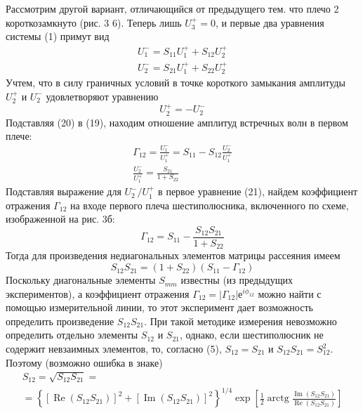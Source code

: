 \documentclass[a4paper,12pt]{article}
\begin{document}
Рассмотрим другой вариант, отличающийся от предыдущего тем. что плечо 2 короткозамкнуто (рис. 3 6). Теперь лишь $U_3^+=0$, и первые два уравнения системы (1) примут вид
\begin{equation}
	\begin{array} { l } { U _ { 1 } ^ { - } = S _ { 11 } U _ { 1 } ^ { + } + S _ { 12 } U _ { 2 } ^ { + } } \\ { U _ { 2 } ^ { - } = S _ { 21 } U _ { 1 } ^ { + } + S _ { 22 } U _ { 2 } ^ { + } } \end{array}
\end{equation}
Учтем, что в силу граничных условий в точке короткого замыкания амплитуды $U_2^+$ и $U_2^-$ удовлетворяют уравнению
\begin{equation}
	U _ { 2 } ^ { + } = - U _ { 2 } ^ { - }
\end{equation}
Подставляя (20) в (19), находим отношение амплитуд встречных волн в первом плече:
\begin{equation}
	\begin{array} { l } { \Gamma _ { 12 } = \frac { U _ { 1 } ^ { - } } { U _ { 1 } ^ { + } } = S _ { 11 } - S _ { 12 } \frac { U _ { 2 } ^ { - } } { U _ { 1 } ^ { + } } } \\ { \frac { U _ { 2 } ^ { - } } { U _ { 1 } ^ { + } } = \frac { S _ { 21 } } { 1 + S _ { 22 } } } \end{array}
\end{equation}
Подставляя выражение для $U_2^-/U_1^+$ в первое уравнение (21), найдем коэффициент отражения $\Gamma_{12}$ на входе первого плеча шестиполюсника, включенного по схеме, изображенной на рис. 3б:
\begin{equation}
	\Gamma _ { 12 } = S _ { 11 } - \frac { S _ { 12 } S _ { 21 } } { 1 + S _ { 22 } }
\end{equation}
Тогда для произведения недиагональных элементов матрицы рассеяния имеем
\begin{equation}
	S _ { 12 } S _ { 21 } = \left( 1 + S _ { 22 } \right) \left( S _ { 11 } - \Gamma _ { 12 } \right)
\end{equation}
Поскольку диагональные элементы $S_{mm}$ известны (из предыдущих экспериментов), а коэффициент отражения $\Gamma_{12}=|\Gamma_{12}|е^{i\phi_{12}}$ можно найти с помощью измерительной линии, то этот эксперимент дает возможность определить произведение $S_{12}S_{21}$.
При такой методике измерения невозможно определить отдельно элементы $S_{12}$ и $S_{21}$, однако, если шестиполюсник не содержит невзаимных элементов, то, согласно (5), $S_{12} = S_{21}$ и $S_{12}S_{21}=S_{12}^2$. 
Поэтому (возможно ошибка в знаке)
\begin{gather}
	S _ { 12 } = \sqrt { S _ { 12 } S _ { 21 } } = \nonumber \\= \left\{ \left[ \operatorname { Re } \left( S _ { 12 } S _ { 21 } \right) \right] ^ { 2 } + \left[ \operatorname { Im } \left( S _ { 12 } S _ { 21 } \right) \right] ^ { 2 } \right\} ^ { 1 / 4 } \exp \left[ \frac { 1 } { 2 } \operatorname { arctg } \frac { \operatorname { Im } \left( S _ { 12 } S _ { 21 } \right) } { \operatorname { Re } \left( S _ { 12 } S _ { 21 } \right) } \right]
\end{gather}
\end{document}
